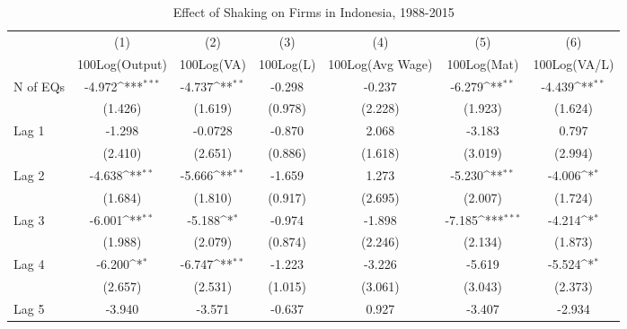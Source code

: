 \begin{table}[htbp]\centering
\def\sym#1{\ifmmode^{#1}\else\(^{#1}\)\fi}
\caption{Effect of Shaking on Firms in Indonesia, 1988-2015}
\begin{tabular}{l*{6}{c}}
\toprule
                &\multicolumn{1}{c}{(1)}&\multicolumn{1}{c}{(2)}&\multicolumn{1}{c}{(3)}&\multicolumn{1}{c}{(4)}&\multicolumn{1}{c}{(5)}&\multicolumn{1}{c}{(6)}\\
                &\multicolumn{1}{c}{100Log(Output)}&\multicolumn{1}{c}{100Log(VA)}&\multicolumn{1}{c}{100Log(L)}&\multicolumn{1}{c}{100Log(Avg Wage)}&\multicolumn{1}{c}{100Log(Mat)}&\multicolumn{1}{c}{100Log(VA/L)}\\
\midrule
N of EQs        &   -4.972\sym{***}&   -4.737\sym{**} &   -0.298         &   -0.237         &   -6.279\sym{**} &   -4.439\sym{**} \\
                &  (1.426)         &  (1.619)         &  (0.978)         &  (2.228)         &  (1.923)         &  (1.624)         \\
\addlinespace
Lag 1           &   -1.298         &  -0.0728         &   -0.870         &    2.068         &   -3.183         &    0.797         \\
                &  (2.410)         &  (2.651)         &  (0.886)         &  (1.618)         &  (3.019)         &  (2.994)         \\
\addlinespace
Lag 2           &   -4.638\sym{**} &   -5.666\sym{**} &   -1.659         &    1.273         &   -5.230\sym{**} &   -4.006\sym{*}  \\
                &  (1.684)         &  (1.810)         &  (0.917)         &  (2.695)         &  (2.007)         &  (1.724)         \\
\addlinespace
Lag 3           &   -6.001\sym{**} &   -5.188\sym{*}  &   -0.974         &   -1.898         &   -7.185\sym{***}&   -4.214\sym{*}  \\
                &  (1.988)         &  (2.079)         &  (0.874)         &  (2.246)         &  (2.134)         &  (1.873)         \\
\addlinespace
Lag 4           &   -6.200\sym{*}  &   -6.747\sym{**} &   -1.223         &   -3.226         &   -5.619         &   -5.524\sym{*}  \\
                &  (2.657)         &  (2.531)         &  (1.015)         &  (3.061)         &  (3.043)         &  (2.373)         \\
\addlinespace
Lag 5           &   -3.940         &   -3.571         &   -0.637         &    0.927         &   -3.407         &   -2.934         \\

\end{tabular}
\end{table}
